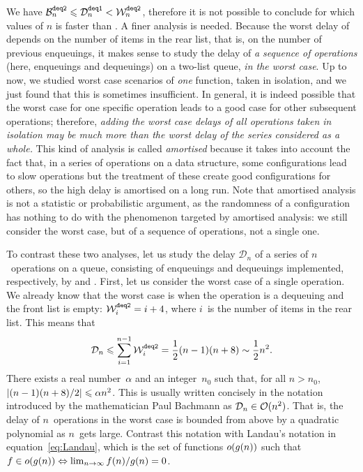 We have \(\best{deq2}{n} \leqslant \comp{deq1}{n} < \worst{deq2}{n}\),
therefore it is not possible to conclude for which values of \(n\)
 is faster than . A finer analysis is
needed. Because the worst delay of  depends on the
number of items in the rear list, that is, on the number of previous
enqueuings, it makes sense to study the delay of \emph{a sequence of
  operations} (here, enqueuings and dequeuings) on a two\hyp{}list
queue, \emph{in the worst case}. Up to now, we studied worst case
scenarios of \emph{one} function, taken in isolation, and we just
found that this is sometimes insufficient. In general, it is indeed
possible that the worst case for one specific operation leads to a
good case for other subsequent operations; therefore, \emph{adding the
  worst case delays of all operations taken in isolation may be much
  more than the worst delay of the series considered as a whole.} This
kind of analysis is called \emph{amortised} because it takes into
account the fact that, in a series of operations on a data structure,
some configurations lead to slow operations but the treatment of these
create good configurations for others, so the high delay is amortised
on a long run. Note that amortised analysis is not a statistic or
probabilistic argument, as the randomness of a configuration has
nothing to do with the phenomenon targeted by amortised analysis: we
still consider the worst case, but of a sequence of operations, not a
single one.

To contrast these two analyses, let us study the delay
\(\mathcal{D}_n\) of a series of \(n\)~operations on a queue,
consisting of enqueuings and dequeuings implemented, respectively, by
 and . First, let us consider the
worst case of a single operation. We already know that the worst case
is when the operation is a dequeuing and the front list is empty:
\(\worst{deq2}{i} = i + 4\), where \(i\)~is the number of items in the
rear list. This means that
\[
\mathcal{D}_n \leqslant \sum_{i=1}^{n-1}{\worst{deq2}{i}} =
\frac{1}{2}{(n-1)(n+8)} \mathrel{\sim} \frac{1}{2}{n^2}.
\]
There exists a real number~\(\alpha\) and an integer~\(n_0\) such
that, for all \({n > n_0}\), \(\abs{(n-1)(n+8)/2} \leqslant \alpha
n^2\). This is usually written concisely in the notation introduced by
the mathematician Paul Bachmann\label{Bachmann} as \(\mathcal{D}_n \in
\bachmann{n^2}\). That is, the delay of \(n\)~operations in the worst
case is bounded from above by a quadratic polynomial as \(n\)~gets
large. Contrast this notation with Landau's notation in
equation~\vref{eq:Landau}, which is the set of functions
\(\landau{g(n)}\) such that \(f \in \landau{g(n)} \Leftrightarrow
\lim_{n \rightarrow \infty}{f(n)/g(n)} = 0\).

